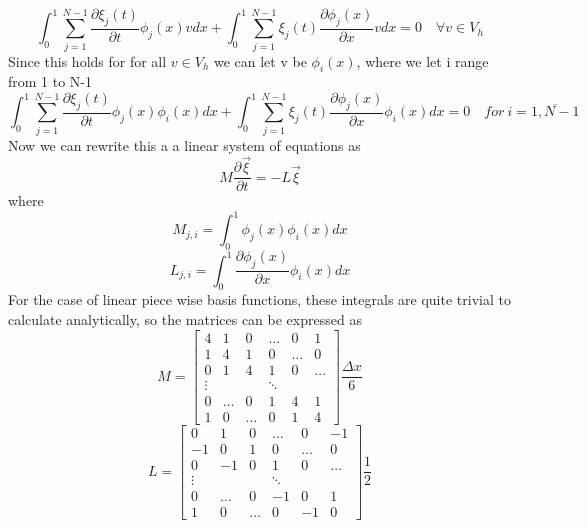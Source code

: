 \documentclass[a4paper,10pt,twoside]{article}
\begin{document}
\begin{equation}
    \int_0^1 \sum\limits_{j=1}^{N-1} \frac{\partial\xi_j(t)}{\partial t}\phi_j(x)v dx+ \int_0^1  \sum\limits_{j=1}^{N-1} \xi_j(t)\frac{\partial\phi_j(x)}{\partial x}v dx= 0 \quad\forall v \in V_h
\end{equation}
Since this holds for for all $v \in V_h$ we can let v be $\phi_i(x)$, where we let i range from 1 to N-1
\begin{equation}
    \int_0^1 \sum\limits_{j=1}^{N-1} \frac{\partial\xi_j(t)}{\partial t}\phi_j(x)\phi_i(x) dx+ \int_0^1  \sum\limits_{j=1}^{N-1} \xi_j(t)\frac{\partial\phi_j(x)}{\partial x}\phi_i(x) dx= 0 \quad for\ i=\overline{1,N-1}
\end{equation}
Now we can rewrite this a a linear system of equations as
\begin{equation}
    M\frac{\partial \Vec{\xi}}{\partial t} = -L\Vec{\xi}
\end{equation}
where
\begin{equation}
    M_{j,i} = \int_0^1\phi_j(x)\phi_i(x)dx
\end{equation}
\begin{equation}
    L_{j,i} = \int_0^1\frac{\partial\phi_j(x)}{\partial x}\phi_i(x)dx
\end{equation}
For the case of linear piece wise basis functions, these integrals are quite trivial to calculate analytically, so the matrices can be expressed as
\begin{equation}
    M = \begin{bmatrix}
        4& 1& 0& \dots& 0& 1\\
        1& 4& 1& 0& \dots& 0\\
        0& 1& 4& 1& 0& \dots\\
        \vdots&&&\ddots\\
        0& \dots& 0& 1& 4& 1\\
        1& 0& \dots& 0& 1& 4
    \end{bmatrix}\frac{\Delta x}{6}
\end{equation}
\begin{equation}
    L = \begin{bmatrix}
        0& 1& 0& \dots& 0& -1\\
        -1& 0& 1& 0& \dots& 0\\
        0& -1& 0& 1& 0& \dots\\
        \vdots&&&\ddots\\
        0& \dots& 0& -1& 0& 1\\
        1& 0& \dots& 0& -1& 0
    \end{bmatrix}\frac{1}{2}
\end{equation}
\end{document}
